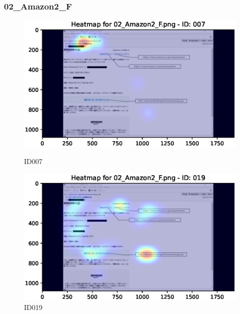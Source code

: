 \documentclass[a4paper,11pt]{ltjsreport}
\begin{document}
\subsubsection{02\_Amazon2\_F}
\begin{figure}[H]
	\centering
	\begin{minipage}[b]{0.49\textwidth}
		\centering
		\includegraphics[width=\linewidth]{img/output/ID007_heatmap_02_Amazon2_F.eps}
		\caption{ID007\label{fig:02007}}
	\end{minipage}
	\begin{minipage}[b]{0.49\textwidth}
		\centering
		\includegraphics[width=\linewidth]{img/output/ID019_heatmap_02_Amazon2_F.eps}
		\caption{ID019\label{fig:02019}}
	\end{minipage}
\end{figure}
\end{document}

